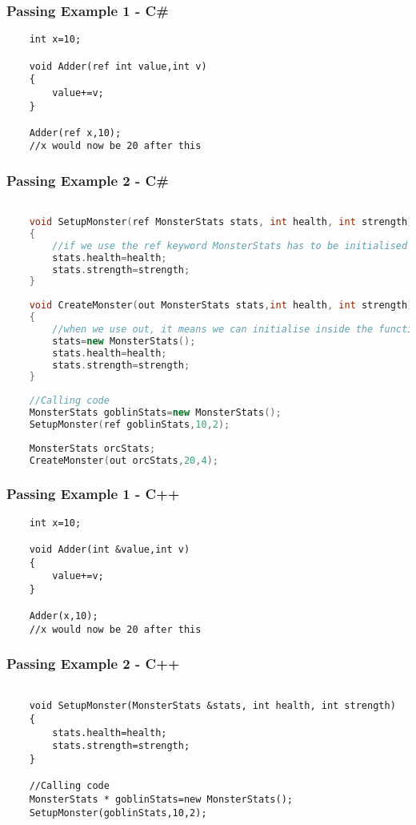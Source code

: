 \begin{frame}[fragile]
\frametitle{Passing Example 1 - C\#}
\begin{lstlisting}
	int x=10;
	
	void Adder(ref int value,int v)
	{
		value+=v;	
	}
	
	Adder(ref x,10);
	//x would now be 20 after this		

\end{lstlisting}
\end{frame}

\begin{frame}[fragile]
\frametitle{Passing Example 2 - C\#}
\begin{lstlisting}[language=C++,basicstyle=\tiny,]

	void SetupMonster(ref MonsterStats stats, int health, int strength)
	{
		//if we use the ref keyword MonsterStats has to be initialised
		stats.health=health;
		stats.strength=strength;
	}
	
	void CreateMonster(out MonsterStats stats,int health, int strength)
	{
		//when we use out, it means we can initialise inside the function
		stats=new MonsterStats();
		stats.health=health;
		stats.strength=strength;
	}
	
	//Calling code
	MonsterStats goblinStats=new MonsterStats();
	SetupMonster(ref goblinStats,10,2);
	
	MonsterStats orcStats;
	CreateMonster(out orcStats,20,4);
\end{lstlisting}
\end{frame}


\begin{frame}[fragile]
\frametitle{Passing Example 1 - C++}
\begin{lstlisting}
	int x=10;

	void Adder(int &value,int v)
	{
		value+=v;	
	}

	Adder(x,10);
	//x would now be 20 after this		

\end{lstlisting}
\end{frame}

\begin{frame}[fragile]
\frametitle{Passing Example 2 - C++}
\begin{lstlisting}

	void SetupMonster(MonsterStats &stats, int health, int strength)
	{
		stats.health=health;
		stats.strength=strength;
	}
	
	//Calling code
	MonsterStats * goblinStats=new MonsterStats();
	SetupMonster(goblinStats,10,2);
\end{lstlisting}
\end{frame}

